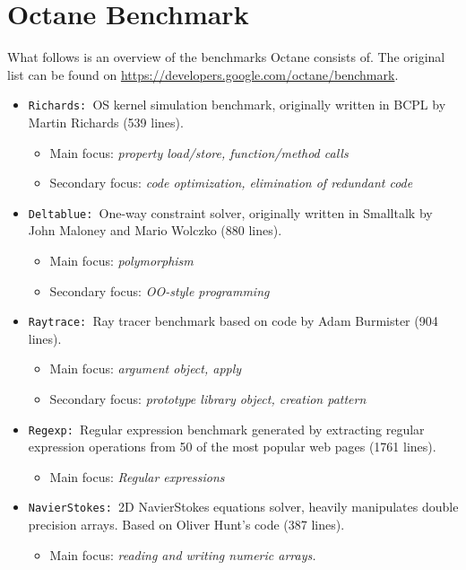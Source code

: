 \section{Octane Benchmark}
\label{a:octane_benchmark}
What follows is an overview of the benchmarks Octane consists of.
The original list can be found on \url{https://developers.google.com/octane/benchmark}.
\begin{itemize}
\item \texttt{Richards: }OS kernel simulation benchmark, originally written in BCPL by Martin Richards (539 lines).
  \begin{itemize}
    \item Main focus: \textit{property load/store, function/method calls}
    \item Secondary focus: \textit{code optimization, elimination of redundant code}
  \end{itemize}
\item \texttt{Deltablue: }One-way constraint solver, originally written in Smalltalk by John Maloney and Mario Wolczko (880 lines).
  \begin{itemize}
    \item Main focus: \textit{polymorphism}
    \item Secondary focus: \textit{OO-style programming}
  \end{itemize}
\item \texttt{Raytrace: }Ray tracer benchmark based on code by Adam Burmister (904 lines).
  \begin{itemize}
    \item Main focus: \textit{argument object, apply}
    \item Secondary focus: \textit{prototype library object, creation pattern}
  \end{itemize}
\item \texttt{Regexp: }Regular expression benchmark generated by extracting regular expression operations from 50 of the most popular web pages (1761 lines).
  \begin{itemize}
    \item Main focus: \textit{Regular expressions}
  \end{itemize}
  \item \texttt{NavierStokes: }2D NavierStokes equations solver, heavily manipulates double precision arrays. Based on Oliver Hunt's code (387 lines).
  \begin{itemize}
    \item Main focus: \textit{reading and writing numeric arrays.}

\end{itemize}
\end{itemize}
